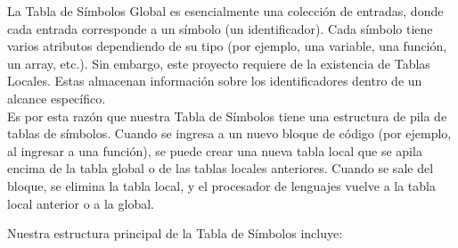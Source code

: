 La Tabla de Símbolos Global es esencialmente una colección de entradas, donde cada entrada corresponde a un símbolo (un identificador). Cada símbolo tiene varios atributos dependiendo de su tipo (por ejemplo, una variable, una función, un array, etc.). Sin embargo, este proyecto requiere de la existencia de Tablas Locales. Estas almacenan información sobre los identificadores dentro de un alcance específico. \\

Es por esta razón que nuestra Tabla de Símbolos tiene una estructura de pila de tablas de símbolos. Cuando se ingresa a un nuevo bloque de código (por ejemplo, al ingresar a una función), se puede crear una nueva tabla local que se apila encima de la tabla global o de las tablas locales anteriores. Cuando se sale del bloque, se elimina la tabla local, y el procesador de lenguajes vuelve a la tabla local anterior o a la global.

Nuestra estructura principal de la Tabla de Símbolos incluye:

